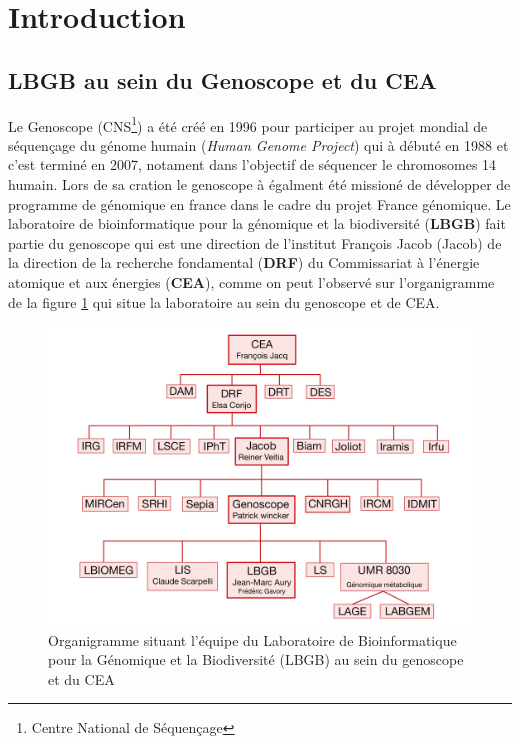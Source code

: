 \section{Introduction}
\subsection{LBGB au sein du Genoscope et du CEA}
Le Genoscope (CNS\footnote{Centre National de Séquençage}) a été créé en 1996 pour participer au projet mondial de séquençage du génome humain (\emph{Human Genome Project}) qui à débuté en 1988 et c'est terminé en 2007, notament dans l'objectif de séquencer le chromosomes 14 humain. Lors de sa cration le genoscope à égalment été missioné de développer de programme de génomique en france dans le cadre du projet France génomique. Le laboratoire de bioinformatique pour la génomique et la biodiversité (\textbf{LBGB}) fait partie du genoscope qui est une direction de l'institut François Jacob (Jacob) de la direction de la recherche fondamental (\textbf{DRF}) du Commissariat à l'énergie atomique et aux énergies (\textbf{CEA}), comme on peut l'observé sur l'organigramme de la figure \ref{organigramme_LBGB} qui situe la laboratoire au sein du genoscope et de CEA.

\begin{figure}[H]
    \centering
    \includegraphics[width=1\textwidth]{img/organigramme.jpg}
    \caption{Organigramme situant l’équipe du Laboratoire de Bioinformatique pour la Génomique et la Biodiversité (LBGB) au sein du genoscope et du CEA}
    \label{organigramme_LBGB}
\end{figure}
